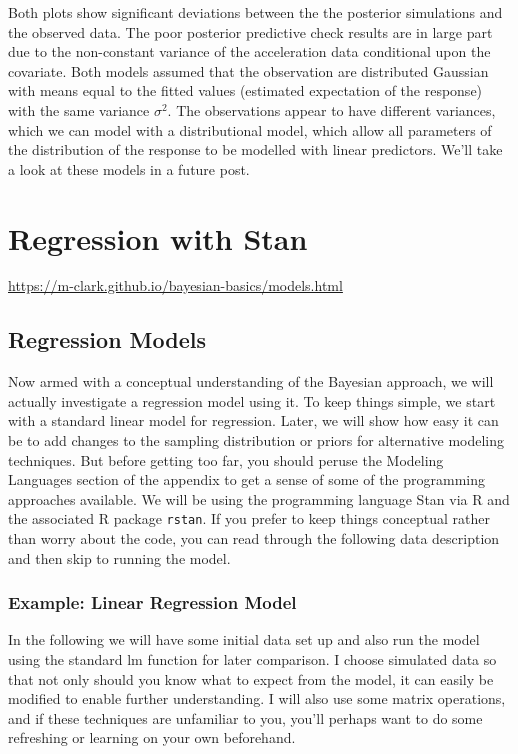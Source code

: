 \documentclass[]{book}
\begin{document}
Both plots show significant deviations between the the posterior simulations and the observed data. The poor posterior predictive check results are in large part due to the non-constant variance of the acceleration data conditional upon the covariate. Both models assumed that the observation are distributed Gaussian with means equal to the fitted values (estimated expectation of the response) with the same variance \(\sigma^2\). The observations appear to have different variances, which we can model with a distributional model, which allow all parameters of the distribution of the response to be modelled with linear predictors. We'll take a look at these models in a future post.

\hypertarget{regression-with-stan}{%
\chapter{Regression with Stan}\label{regression-with-stan}}

\url{https://m-clark.github.io/bayesian-basics/models.html}

\hypertarget{regression-models}{%
\section{Regression Models}\label{regression-models}}

Now armed with a conceptual understanding of the Bayesian approach, we will actually investigate a regression model using it. To keep things simple, we start with a standard linear model for regression. Later, we will show how easy it can be to add changes to the sampling distribution or priors for alternative modeling techniques. But before getting too far, you should peruse the Modeling Languages section of the appendix to get a sense of some of the programming approaches available. We will be using the programming language Stan via R and the associated R package \texttt{rstan}. If you prefer to keep things conceptual rather than worry about the code, you can read through the following data description and then skip to running the model.

\hypertarget{example-linear-regression-model}{%
\subsection{Example: Linear Regression Model}\label{example-linear-regression-model}}

In the following we will have some initial data set up and also run the model using the standard lm function for later comparison. I choose simulated data so that not only should you know what to expect from the model, it can easily be modified to enable further understanding. I will also use some matrix operations, and if these techniques are unfamiliar to you, you'll perhaps want to do some refreshing or learning on your own beforehand.
\end{document}
